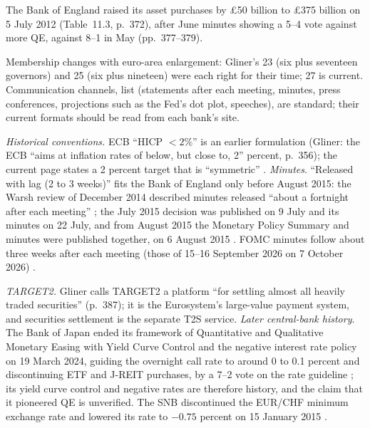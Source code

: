 \begin{qfrule}
The Bank of England raised its asset purchases by \pounds50 billion to \pounds375 billion on 5 July 2012 (Table~11.3, p.~372), after June minutes showing a 5--4 vote against more QE, against 8--1 in May (pp.~377--379).

 Membership changes with euro-area enlargement: Gliner's 23 (six plus seventeen governors) and 25 (six plus nineteen) were each right for their time; 27 is current. Communication channels, list (statements after each meeting, minutes, press conferences, projections such as the Fed's dot plot, speeches), are standard; their current formats should be read from each bank's site.

 \emph{Historical conventions.} ECB ``HICP $<2\%$'' is an earlier formulation (Gliner: the ECB ``aims at inflation rates of below, but close to, 2'' percent, p.~356); the current page states a 2 percent target that is ``symmetric'' \citep[web page]{ecb-strategy}. \emph{Minutes}. ``Released with lag (2 to 3 weeks)'' fits the Bank of England only before August 2015: the Warsh review of December 2014 described minutes released ``about a fortnight after each meeting'' \citep[PDF p.~10]{warsh-2014}; the July 2015 decision was published on 9 July and its minutes on 22 July, and from August 2015 the Monetary Policy Summary and minutes were published together, on 6 August 2015 \citep[2015 documentation page]{boe-mpc-docs-2015}. FOMC minutes follow about three weeks after each meeting (those of 15--16 September 2026 on 7 October 2026) \citep[2026 calendar]{fomc-calendars}.

\emph{TARGET2.} Gliner calls TARGET2 a platform ``for settling almost all heavily traded securities'' (p.~387); it is the Eurosystem's large-value payment system, and securities settlement is the separate T2S service. \emph{Later central-bank history}. The Bank of Japan ended its framework of Quantitative and Qualitative Monetary Easing with Yield Curve Control and the negative interest rate policy on 19 March 2024, guiding the overnight call rate to around 0 to 0.1 percent and discontinuing ETF and J-REIT purchases, by a 7--2 vote on the rate guideline \citep[statement of 19 March 2024, pp.~1--2]{boj-2024-framework}; its yield curve control and negative rates are therefore history, and the claim that it pioneered QE is unverified. The SNB discontinued the EUR/CHF minimum exchange rate and lowered its rate to $-0.75$ percent on 15 January 2015 \citep[press release title and date]{snb-2015-floor}.


\end{qfrule}
